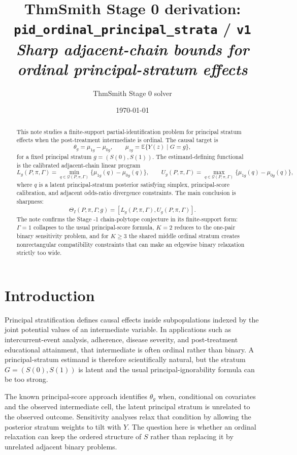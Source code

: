\documentclass[11pt]{article}
\title{ThmSmith Stage 0 derivation: \texttt{pid\_ordinal\_principal\_strata} / \texttt{v1}%
  \\ \large\textit{Sharp adjacent-chain bounds for ordinal principal-stratum effects}}
\author{ThmSmith Stage 0 solver}
\date{\today}
\newcommand{\E}{\mathbb{E}}
\theoremstyle{definition}
\theoremstyle{plain}
\theoremstyle{remark}
\begin{document}
\maketitle


\begin{abstract}
This note studies a finite-support partial-identification problem for principal
stratum effects when the post-treatment intermediate is ordinal.  The causal
target is
\[
  \theta_g=\mu_{1g}-\mu_{0g},\qquad
  \mu_{zg}=\E\{Y(z)\mid G=g\},
\]
for a fixed principal stratum \(g=(S(0),S(1))\).  The estimand-defining
functional is the calibrated adjacent-chain linear program
\[
  L_g(P,\pi,\Gamma)
  =
  \min_{q\in\mathcal Q(P,\pi,\Gamma)}
  \{\mu_{1g}(q)-\mu_{0g}(q)\},\qquad
  U_g(P,\pi,\Gamma)
  =
  \max_{q\in\mathcal Q(P,\pi,\Gamma)}
  \{\mu_{1g}(q)-\mu_{0g}(q)\},
\]
where \(q\) is a latent principal-stratum posterior satisfying simplex,
principal-score calibration, and adjacent odds-ratio divergence constraints.
The main conclusion is sharpness:
\[
  \Theta_I(P,\pi,\Gamma;g)
  =
  [L_g(P,\pi,\Gamma),U_g(P,\pi,\Gamma)].
\]
The note confirms the Stage -1 chain-polytope conjecture in its finite-support
form: \(\Gamma=1\) collapses to the usual principal-score formula, \(K=2\)
reduces to the one-pair binary sensitivity problem, and for \(K\ge3\) the
shared middle ordinal stratum creates nonrectangular compatibility constraints
that can make an edgewise binary relaxation strictly too wide.
\end{abstract}

\section{Introduction}
Principal stratification defines causal effects inside subpopulations indexed
by the joint potential values of an intermediate variable.  In applications
such as intercurrent-event analysis, adherence, disease severity, and
post-treatment educational attainment, that intermediate is often ordinal
rather than binary.  A principal-stratum estimand is therefore scientifically
natural, but the stratum \(G=(S(0),S(1))\) is latent and the usual
principal-ignorability formula can be too strong.

The known principal-score approach identifies \(\theta_g\) when, conditional
on covariates and the observed intermediate cell, the latent principal stratum
is unrelated to the observed outcome.  Sensitivity analyses relax that
condition by allowing the posterior stratum weights to tilt with \(Y\).  The
question here is whether an ordinal relaxation can keep the ordered structure
of \(S\) rather than replacing it by unrelated adjacent binary problems.
\end{document}

